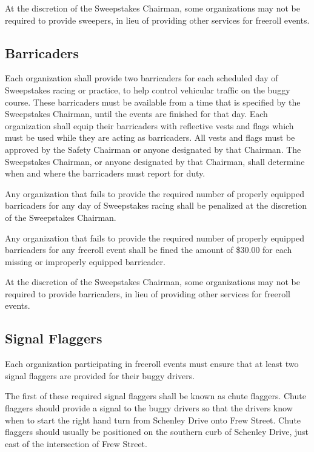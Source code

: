 	At the discretion of the Sweepstakes Chairman, some organizations may not be
	required to provide sweepers, in lieu of providing other services for freeroll
	events.

\subsection{Barricaders}
\label{subsec:Barricaders}

	Each organization shall provide two barricaders for each scheduled day of
	Sweepstakes racing or practice, to help control vehicular traffic on the buggy course.
	These barricaders must be available from a time that is specified by the
    Sweepstakes Chairman, until the events are finished for that day. Each
	organization shall equip their barricaders with reflective vests and flags which
	must be used while they are acting as barricaders. All vests and flags must be
	approved by the Safety Chairman or anyone designated by that Chairman. The
	Sweepstakes Chairman, or anyone designated by that Chairman, shall determine
	when and where the barricaders must report for duty.

	Any organization that fails to provide the required number of properly equipped
	barricaders for any day of Sweepstakes racing shall be penalized at the discretion
    of the Sweepstakes Chairman.

	Any organization that fails to provide the required number of properly equipped
	barricaders for any freeroll event shall be fined the amount of \$30.00 for
	each missing or improperly equipped barricader.

    At the discretion of the Sweepstakes Chairman, some organizations may not be
	required to provide barricaders, in lieu of providing other services for freeroll
	events.


\subsection{Signal Flaggers}
\label{subsec:Flaggers}

	Each organization participating in freeroll events must ensure that at least
    two signal flaggers are provided for their buggy drivers.

    The first of these required signal flaggers shall be known as chute flaggers.
    Chute flaggers should provide a signal to the buggy drivers so that the
    drivers know when to start the right hand turn from Schenley Drive onto
    Frew Street. Chute flaggers should usually be positioned on the southern curb
    of Schenley Drive, just east of the intersection of Frew Street.

